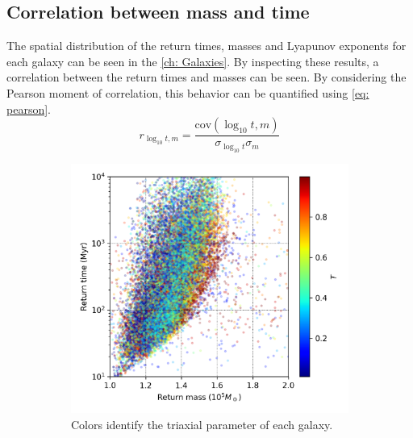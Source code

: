 	\subsection{Correlation between mass and time}
	The spatial distribution of the return times, masses and Lyapunov exponents for each galaxy can be seen in the \autoref{ch: Galaxies}. By inspecting these results, a correlation between the return times and masses can be seen. By considering the Pearson moment of correlation, this behavior can be quantified using \autoref{eq: pearson}.
	\begin{equation}\label{eq: pearson}
		r_{\log_{10}t, m} = \dfrac{\text{cov}(\log_{10}t, m)}{\sigma_{\log_{10}t}\sigma_m}
	\end{equation}
	
	\begin{figure}[h]
		\centering
		\begin{subfigure}[b]{0.49\textwidth}
			\includegraphics[width = \textwidth]{"../Files/Week 13/correlation_T"}
			\caption{Colors identify the triaxial parameter of each galaxy.}
			\label{fig: triaxial_correlation}
		\end{subfigure}
		~ 
		\begin{subfigure}[b]{0.49\textwidth}

\end{subfigure}
\end{figure}
